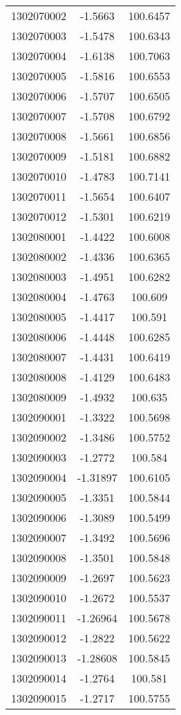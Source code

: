 \begin{longtable}{@{}lcc@{}}
1302070002 & -1.5663 & 100.6457\\ 
1302070003 & -1.5478 & 100.6343\\ 
1302070004 & -1.6138 & 100.7063\\ 
1302070005 & -1.5816 & 100.6553\\ 
1302070006 & -1.5707 & 100.6505\\ 
1302070007 & -1.5708 & 100.6792\\ 
1302070008 & -1.5661 & 100.6856\\ 
1302070009 & -1.5181 & 100.6882\\ 
1302070010 & -1.4783 & 100.7141\\ 
1302070011 & -1.5654 & 100.6407\\ 
1302070012 & -1.5301 & 100.6219\\ 
1302080001 & -1.4422 & 100.6008\\ 
1302080002 & -1.4336 & 100.6365\\ 
1302080003 & -1.4951 & 100.6282\\ 
1302080004 & -1.4763 & 100.609\\ 
1302080005 & -1.4417 & 100.591\\ 
1302080006 & -1.4448 & 100.6285\\ 
1302080007 & -1.4431 & 100.6419\\ 
1302080008 & -1.4129 & 100.6483\\ 
1302080009 & -1.4932 & 100.635\\ 
1302090001 & -1.3322 & 100.5698\\ 
1302090002 & -1.3486 & 100.5752\\ 
1302090003 & -1.2772 & 100.584\\ 
1302090004 & -1.31897 & 100.6105\\ 
1302090005 & -1.3351 & 100.5844\\ 
1302090006 & -1.3089 & 100.5499\\ 
1302090007 & -1.3492 & 100.5696\\ 
1302090008 & -1.3501 & 100.5848\\ 
1302090009 & -1.2697 & 100.5623\\ 
1302090010 & -1.2672 & 100.5537\\ 
1302090011 & -1.26964 & 100.5678\\ 
1302090012 & -1.2822 & 100.5622\\ 
1302090013 & -1.28608 & 100.5845\\ 
1302090014 & -1.2764 & 100.581\\ 
1302090015 & -1.2717 & 100.5755\\ 

\end{longtable}
